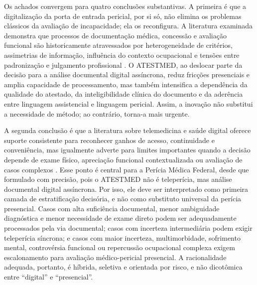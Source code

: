 \documentclass[12pt,a4paper]{article}
\begin{document}
Os achados convergem para quatro conclusões substantivas. A primeira é que a digitalização da porta de entrada pericial, por si só, não elimina os problemas clássicos da avaliação de incapacidade; ela os reconfigura. A literatura examinada demonstra que processos de documentação médica, concessão e avaliação funcional são historicamente atravessados por heterogeneidade de critérios, assimetrias de informação, influência do contexto ocupacional e tensões entre padronização e julgamento profissional \parencite{gabbay2011niceguidanceonlongtermsicknessandincapacity, dijkstrasdatamakingupincapacityforwork, steenbeek2011thedevelopmentofinstrumentstomeasuretheworkdisa}. O ATESTMED, ao deslocar parte da decisão para a análise documental digital assíncrona, reduz fricções presenciais e amplia capacidade de processamento, mas também intensifica a dependência da qualidade do atestado, da inteligibilidade clínica do documento e da aderência entre linguagem assistencial e linguagem pericial. Assim, a inovação não substitui a necessidade de método; ao contrário, torna-a mais urgente.

A segunda conclusão é que a literatura sobre telemedicina e saúde digital oferece suporte consistente para reconhecer ganhos de acesso, continuidade e conveniência, mas igualmente adverte para limites importantes quando a decisão depende de exame físico, apreciação funcional contextualizada ou avaliação de casos complexos \parencite{ftouni2022challengesoftelemedicineduringthecovid19pandemica, guo2017assessmentofaphasiaacrosstheinternationalclassification, albasheer2026telemedicineutilizationanddigitalinclusionamongpe}. Esse ponto é central para a Perícia Médica Federal, desde que formulado com precisão, pois o ATESTMED não é teleperícia, mas análise documental digital assíncrona. Por isso, ele deve ser interpretado como primeira camada de estratificação decisória, e não como substituto universal da perícia presencial. Casos com alta suficiência documental, menor ambiguidade diagnóstica e menor necessidade de exame direto podem ser adequadamente processados pela via documental; casos com incerteza intermediária podem exigir teleperícia síncrona; e casos com maior incerteza, multimorbidade, sofrimento mental, controvérsia funcional ou repercussão ocupacional complexa exigem escalonamento para avaliação médico-pericial presencial. A racionalidade adequada, portanto, é híbrida, seletiva e orientada por risco, e não dicotômica entre “digital” e “presencial”.
\end{document}
